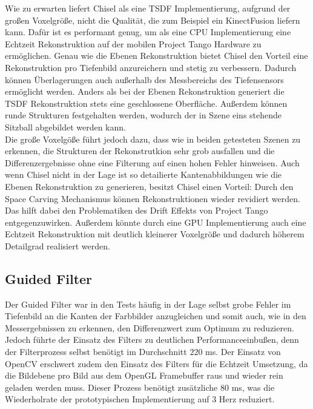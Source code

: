 Wie zu erwarten liefert Chisel als eine TSDF Implementierung, aufgrund der großen Voxelgröße, nicht die Qualität, die zum Beispiel ein KinectFusion liefern kann. Dafür ist es performant genug, um als eine CPU Implementierung eine Echtzeit Rekonstruktion auf der mobilen Project Tango Hardware zu ermöglichen. Genau wie die Ebenen Rekonstruktion bietet Chisel den Vorteil eine Rekonstruktion pro Tiefenbild anzureichern und stetig zu verbessern. Dadurch können Überlagerungen auch außerhalb des Messbereichs des Tiefensensors ermöglicht werden. Anders als bei der Ebenen Rekonstruktion generiert die TSDF Rekonstruktion stets eine geschlossene Oberfläche. Außerdem können runde Strukturen festgehalten werden, wodurch der in Szene eins stehende Sitzball abgebildet werden kann. \\

Die große Voxelgöße führt jedoch dazu, dass wie in beiden getesteten Szenen zu erkennen, die Strukturen der Rekonstrutkion sehr grob ausfallen und die Differenzergebnisse ohne eine Filterung auf einen hohen Fehler hinweisen. Auch wenn Chisel nicht in der Lage ist so detailierte Kantenabbildungen wie die Ebenen Rekonstruktion zu generieren, besitzt Chisel einen Vorteil: Durch den Space Carving Mechanismus können Rekonstruktionen wieder revidiert werden. Das hilft dabei den Problematiken des Drift Effekts von Project Tango entgegenzuwirken. Außerdem könnte durch eine GPU Implementierung auch eine Echtzeit Rekonstruktion mit deutlich kleinerer Voxelgröße und dadurch höherem Detailgrad realisiert werden.


\subsection*{Guided Filter}

Der Guided Filter war in den Tests häufig in der Lage selbst grobe Fehler im Tiefenbild an die Kanten der Farbbilder anzugleichen und somit auch, wie in den Messergebnissen zu erkennen, den Differenzwert zum Optimum zu reduzieren. Jedoch führte der Einsatz des Filters zu deutlichen Performanceeinbußen, denn der Filterprozess selbst benötigt im Durchschnitt \(220\) ms. Der Einsatz von OpenCV erschwert zudem den Einsatz des Filters für die Echtzeit Umsetzung, da die Bildebene pro Bild aus dem OpenGL Framebuffer raus und wieder rein geladen werden muss. Dieser Prozess benötigt zusätzliche \(80\) ms, was die Wiederholrate der prototypischen Implementierung auf 3 Herz reduziert. \\

